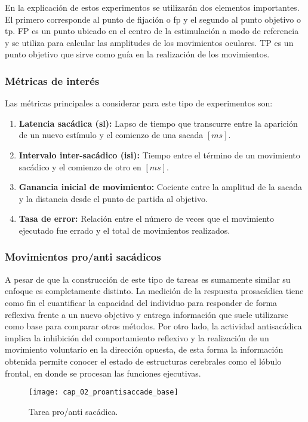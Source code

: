 \documentclass[../main.tex]{subfiles}
\begin{document}
			En la explicación de estos experimentos se utilizarán dos elementos importantes. El primero corresponde al punto de fijación o \acrshort{fp} y el segundo al punto objetivo o \acrshort{tp}. FP es un punto ubicado en el centro de la estimulación a modo de referencia y se utiliza para calcular las amplitudes de los movimientos oculares. TP es un punto objetivo que sirve como guía en la realización de los movimientos. 

			\subsubsection{Métricas de interés}
			\label{ssub:metricas_de_interes}

				Las métricas principales a considerar para este tipo de experimentos son:
				\begin{enumerate}
				 	\item \textbf{Latencia sacádica (\acrshort{sl}):} Lapso de tiempo que transcurre entre la aparición de un nuevo estímulo y el comienzo de una sacada $[ms]$. 

				 	\item \textbf{Intervalo inter-sacádico (\acrshort{isi}):} Tiempo entre el término de un movimiento sacádico y el comienzo de otro en $[ms]$.
				 	
				 	\item \textbf{Ganancia inicial de movimiento:} Cociente entre la amplitud de la sacada y la distancia desde el punto de partida al objetivo. 
				 	
				 	\item \textbf{Tasa de error:} Relación entre el número de veces que el movimiento ejecutado fue errado y el total de movimientos realizados. 

				 \end{enumerate} 

			\subsubsection{Movimientos pro/anti sacádicos}
			\label{ssub:movimientos_pro_anti_sacadicos}

				A pesar de que la construcción de este tipo de tareas es sumamente similar su enfoque es completamente distinto. La medición de la respuesta prosacádica tiene como fin el cuantificar la capacidad del individuo para responder de forma reflexiva frente a un nuevo objetivo y entrega información que suele utilizarse como base para comparar otros métodos. Por otro lado, la actividad antisacádica implica la inhibición del comportamiento reflexivo y la realización de un movimiento voluntario en la dirección opuesta, de esta forma la información obtenida permite conocer el estado de estructuras cerebrales como el lóbulo frontal, en donde se procesan las funciones ejecutivas.
				\begin{figure}[H]
					\centering
					\texttt{[image: cap\_02\_proantisaccade\_base]}
					\caption{Tarea pro/anti sacádica.}
					\label{fig:02_pro_anti_saccade_base}
				\end{figure}  
\end{document}
